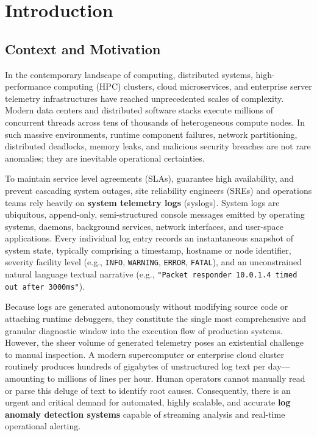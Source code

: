 \chapter{Introduction}
\label{ch:intro}

\section{Context and Motivation}
\label{sec:intro_context}
In the contemporary landscape of computing, distributed systems, high-performance computing (HPC) clusters, cloud microservices, and enterprise server telemetry infrastructures have reached unprecedented scales of complexity. Modern data centers and distributed software stacks execute millions of concurrent threads across tens of thousands of heterogeneous compute nodes. In such massive environments, runtime component failures, network partitioning, distributed deadlocks, memory leaks, and malicious security breaches are not rare anomalies; they are inevitable operational certainties.

To maintain service level agreements (SLAs), guarantee high availability, and prevent cascading system outages, site reliability engineers (SREs) and operations teams rely heavily on \textbf{system telemetry logs} (syslogs). System logs are ubiquitous, append-only, semi-structured console messages emitted by operating systems, daemons, background services, network interfaces, and user-space applications. Every individual log entry records an instantaneous snapshot of system state, typically comprising a timestamp, hostname or node identifier, severity facility level (e.g., \texttt{INFO}, \texttt{WARNING}, \texttt{ERROR}, \texttt{FATAL}), and an unconstrained natural language textual narrative (e.g., \texttt{"Packet responder 10.0.1.4 timed out after 3000ms"}).

Because logs are generated autonomously without modifying source code or attaching runtime debuggers, they constitute the single most comprehensive and granular diagnostic window into the execution flow of production systems. However, the sheer volume of generated telemetry poses an existential challenge to manual inspection. A modern supercomputer or enterprise cloud cluster routinely produces hundreds of gigabytes of unstructured log text per day—amounting to millions of lines per hour. Human operators cannot manually read or parse this deluge of text to identify root causes. Consequently, there is an urgent and critical demand for automated, highly scalable, and accurate \textbf{log anomaly detection systems} capable of streaming analysis and real-time operational alerting.

